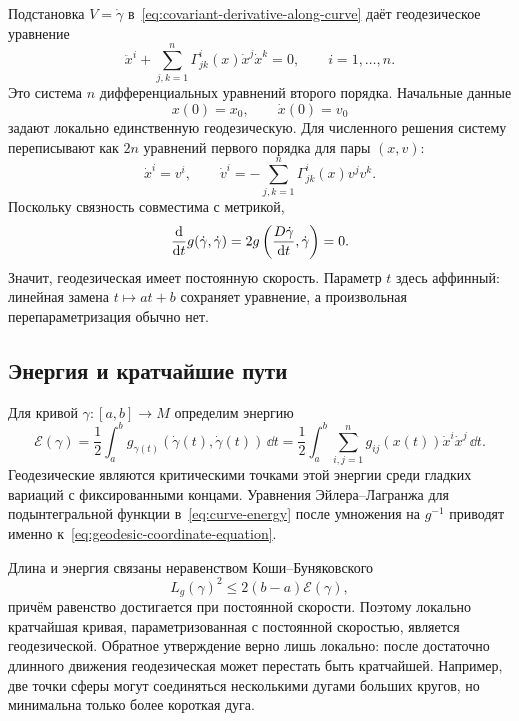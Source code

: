 Подстановка $V=\dot\gamma$ в~\eqref{eq:covariant-derivative-along-curve} даёт геодезическое уравнение
\begin{equation}
\label{eq:geodesic-coordinate-equation}
\boxed{
\ddot x^i
+
\sum_{j,k=1}^n
\Gamma^i_{jk}(x)\dot x^j\dot x^k
=0,
\qquad i=1,\ldots,n.
}
\end{equation}
Это система $n$ дифференциальных уравнений второго порядка. Начальные данные
\[
x(0)=x_0,
\qquad
\dot x(0)=v_0
\]
задают локально единственную геодезическую. Для численного решения систему переписывают как $2n$ уравнений первого порядка для пары $(x,v)$:
\begin{equation}
\label{eq:geodesic-first-order-system}
\dot x^i=v^i,
\qquad
\dot v^i=-\sum_{j,k=1}^n\Gamma^i_{jk}(x)v^jv^k.
\end{equation}
Поскольку связность совместима с метрикой,
\[
\frac{\mathop{}\!\mathrm{d} }{\mathop{}\!\mathrm{d} t}g(\dot\gamma,\dot\gamma)
=2g\left(\frac{D\dot\gamma}{\mathop{}\!\mathrm{d} t},\dot\gamma\right)=0.
\]
Значит, геодезическая имеет постоянную скорость. Параметр $t$ здесь аффинный: линейная замена $t\mapsto at+b$ сохраняет уравнение, а произвольная перепараметризация обычно нет.

\subsection{Энергия и кратчайшие пути}

Для кривой $\gamma:[a,b]\to M$ определим энергию
\begin{equation}
\label{eq:curve-energy}
\mathcal E(\gamma)
=
\frac12\int_a^b
 g_{\gamma(t)}(\dot\gamma(t),\dot\gamma(t))\,\dd t
=
\frac12\int_a^b
\sum_{i,j=1}^n g_{ij}(x(t))\dot x^i\dot x^j\,\dd t.
\end{equation}
Геодезические являются критическими точками этой энергии среди гладких вариаций с фиксированными концами. Уравнения Эйлера--Лагранжа для подынтегральной функции в~\eqref{eq:curve-energy} после умножения на $g^{-1}$ приводят именно к~\eqref{eq:geodesic-coordinate-equation}.

Длина и энергия связаны неравенством Коши--Буняковского
\begin{equation}
\label{eq:length-energy-inequality}
L_g(\gamma)^2
\leq
2(b-a)\mathcal E(\gamma),
\end{equation}
причём равенство достигается при постоянной скорости. Поэтому локально кратчайшая кривая, параметризованная с постоянной скоростью, является геодезической. Обратное утверждение верно лишь локально: после достаточно длинного движения геодезическая может перестать быть кратчайшей. Например, две точки сферы могут соединяться несколькими дугами больших кругов, но минимальна только более короткая дуга.

